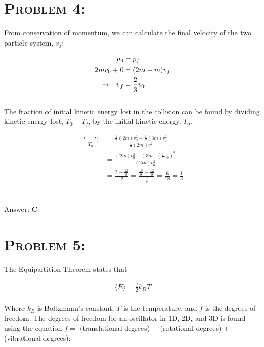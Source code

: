 \documentclass{article}
\begin{document}

\section{\textsc{Problem 4:}} From conservation of momentum, we can calculate the final velocity of the two particle system, $v_{f}$:

\begin{align}
p_{0} &= p_{f} \nonumber\\
2m v_{0} + 0 &= (2m + m) v_{f}\nonumber\\
\rightarrow \hspace{.1in} v_{f} &= \frac{2}{3} v_{0} \nonumber
\end{align}
\\
The fraction of initial kinetic energy lost in the collision can be found by dividing kinetic energy lost, $ T_{0} - T_{f} $, by the initial kinetic energy, $T_{0}$.

\begin{align}
\frac{T_{0} - T_{f}}{T_{0}} &=  \frac{   \frac{1}{2} (2m) v_{0}^{2} - \frac{1}{2} (3m) v_{f}^{2}   }{\frac{1}{2} (2m) v_{0}^{2}}\nonumber\\
&=\frac{ (2m) v_{0}^{2} - (3m) \left(  \frac{2}{3} v_{0} \right)^{2}   }{(2m) v_{0}^{2}}\nonumber\\
&= \frac{2 - \frac{12}{9} }{2} = \frac{\frac{18}{9} - \frac{12}{9}}{\frac{18}{9}} = \frac{6}{18} = \boxed{\frac{1}{3}}\nonumber
\end{align}
\\\\
Answer: \textbf{\textcolor{ProcessBlue}C}\\


\section{\textsc{Problem 5:}} The Equipartition Theorem states that

\begin{gather}
\langle  E  \rangle = \frac{f}{2} k_{B}T
\end{gather}
\\
Where $k_{B}$ is Boltzmann's constant, $T$ is the temperature, and $f$ is the degrees of freedom. The degrees of freedom for an oscillator in 1D, 2D, and 3D is found using the equation $f =$ (translational degrees) $+$ (rotational degrees) $+$ (vibrational degrees):\\
\end{document}
